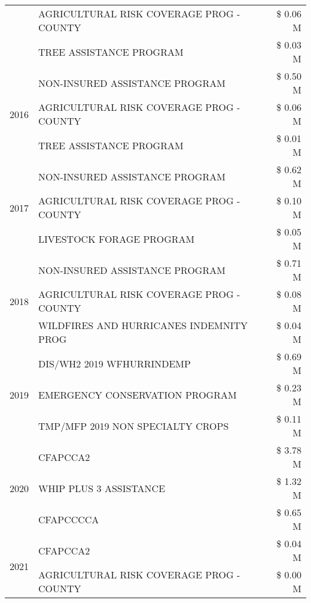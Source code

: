 \begin{tabular}{llr}
 & AGRICULTURAL RISK COVERAGE PROG - COUNTY & \$ 0.06 M \\
 & TREE ASSISTANCE PROGRAM & \$ 0.03 M \\
\cline{1-3}
\multirow[t]{3}{*}{2016} & NON-INSURED ASSISTANCE PROGRAM & \$ 0.50 M \\
 & AGRICULTURAL RISK COVERAGE PROG - COUNTY & \$ 0.06 M \\
 & TREE ASSISTANCE PROGRAM & \$ 0.01 M \\
\cline{1-3}
\multirow[t]{3}{*}{2017} & NON-INSURED ASSISTANCE PROGRAM & \$ 0.62 M \\
 & AGRICULTURAL RISK COVERAGE PROG - COUNTY & \$ 0.10 M \\
 & LIVESTOCK FORAGE PROGRAM & \$ 0.05 M \\
\cline{1-3}
\multirow[t]{3}{*}{2018} & NON-INSURED ASSISTANCE PROGRAM & \$ 0.71 M \\
 & AGRICULTURAL RISK COVERAGE PROG - COUNTY & \$ 0.08 M \\
 & WILDFIRES AND HURRICANES INDEMNITY PROG & \$ 0.04 M \\
\cline{1-3}
\multirow[t]{3}{*}{2019} & DIS/WH2 2019 WFHURRINDEMP & \$ 0.69 M \\
 & EMERGENCY CONSERVATION PROGRAM & \$ 0.23 M \\
 & TMP/MFP 2019 NON SPECIALTY CROPS & \$ 0.11 M \\
\cline{1-3}
\multirow[t]{3}{*}{2020} & CFAPCCA2 & \$ 3.78 M \\
 & WHIP PLUS 3 ASSISTANCE & \$ 1.32 M \\
 & CFAPCCCCA & \$ 0.65 M \\
\cline{1-3}
\multirow[t]{2}{*}{2021} & CFAPCCA2 & \$ 0.04 M \\
 & AGRICULTURAL RISK COVERAGE PROG - COUNTY & \$ 0.00 M \\
\cline{1-3}
\bottomrule
\end{tabular}
